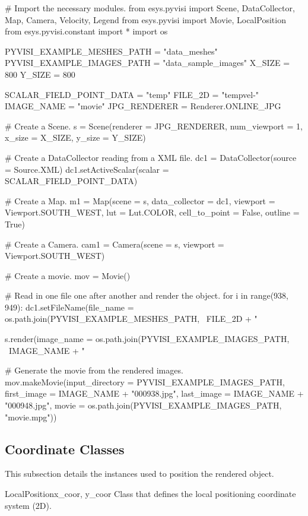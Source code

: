 \begin{python}
# Import the necessary modules.
from esys.pyvisi import Scene, DataCollector, Map, Camera, Velocity, Legend 
from esys.pyvisi import Movie, LocalPosition
from esys.pyvisi.constant import *
import os

PYVISI_EXAMPLE_MESHES_PATH = "data_meshes"
PYVISI_EXAMPLE_IMAGES_PATH = "data_sample_images"
X_SIZE = 800
Y_SIZE = 800

SCALAR_FIELD_POINT_DATA = "temp"
FILE_2D = "tempvel-"
IMAGE_NAME = "movie"
JPG_RENDERER = Renderer.ONLINE_JPG

# Create a Scene.
s = Scene(renderer = JPG_RENDERER, num_viewport = 1, x_size = X_SIZE, 
        y_size = Y_SIZE)

# Create a DataCollector reading from a XML file. 
dc1 = DataCollector(source = Source.XML)
dc1.setActiveScalar(scalar = SCALAR_FIELD_POINT_DATA)

# Create a Map.
m1 = Map(scene = s, data_collector = dc1, 
        viewport = Viewport.SOUTH_WEST, lut = Lut.COLOR, cell_to_point = False,
        outline = True)

# Create a Camera.
cam1 = Camera(scene = s, viewport = Viewport.SOUTH_WEST)

# Create a movie.
mov = Movie()

# Read in one file one after another and render the object. 
for i in range(938, 949):
    dc1.setFileName(file_name =  os.path.join(PYVISI_EXAMPLE_MESHES_PATH, \
	        FILE_2D + "%

    s.render(image_name = os.path.join(PYVISI_EXAMPLE_IMAGES_PATH, \
            IMAGE_NAME + "%

# Generate the movie from the rendered images.
mov.makeMovie(input_directory = PYVISI_EXAMPLE_IMAGES_PATH, 
        first_image = IMAGE_NAME + "000938.jpg", 
        last_image = IMAGE_NAME + "000948.jpg", 
        movie = os.path.join(PYVISI_EXAMPLE_IMAGES_PATH, "movie.mpg"))
\end{python}




\subsection{Coordinate Classes}
This subsection details the instances used to position the rendered object.

\begin{classdesc}{LocalPosition}{x_coor, y_coor}
Class that defines the local positioning coordinate system (2D).
\end{classdesc}

